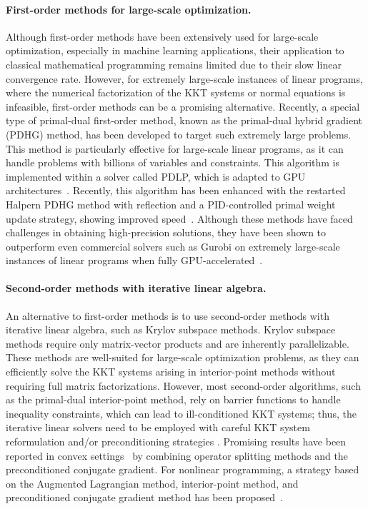 \documentclass[smallextended]{svjour3}
\begin{document}
\paragraph{First-order methods for large-scale optimization.}
Although first-order methods have been extensively used for large-scale optimization, especially in machine learning applications, their application to classical mathematical programming remains limited due to their slow linear convergence rate.
However, for extremely large-scale instances of linear programs, where the numerical factorization of the KKT systems or normal equations is infeasible, first-order methods can be a promising alternative.
Recently, a special type of primal-dual first-order method, known as the primal-dual hybrid gradient (PDHG) method, has been developed to target such extremely large problems.
This method is particularly effective for large-scale linear programs, as it can handle problems with billions of variables and constraints.
This algorithm is implemented within a solver called PDLP, which is adapted to GPU architectures~\cite{lu2023cupdlp,lu2023cupdlp2}.
Recently, this algorithm has been enhanced with the restarted Halpern PDHG method with reflection and a PID-controlled primal weight update strategy, showing improved speed~\cite{luCuPDLPFurtherEnhanced2025}.
Although these methods have faced challenges in obtaining high-precision solutions, they have been shown to outperform even commercial solvers such as Gurobi on extremely large-scale instances of linear programs when fully GPU-accelerated~\cite{lu2023cupdlp,lu2023cupdlp2}.

\paragraph{Second-order methods with iterative linear algebra.}
An alternative to first-order methods is to use second-order methods with iterative linear algebra, such as Krylov subspace methods.
Krylov subspace methods require only matrix-vector products and are inherently parallelizable.
These methods are well-suited for large-scale optimization problems, as they can efficiently solve the KKT systems arising in interior-point methods without requiring full matrix factorizations.
However, most second-order algorithms, such as the primal-dual interior-point method, rely on barrier functions to handle inequality constraints, which can lead to ill-conditioned KKT systems; thus, the iterative linear solvers need to be employed with careful KKT system reformulation and/or preconditioning strategies \cite{curtisNoteImplementationInteriorpoint2012,rodriguezScalablePreconditioningBlockstructured2020}.
Promising results have been reported in convex settings~\cite{schubigerGPUAccelerationADMM2020} by combining operator splitting methods and the preconditioned conjugate gradient.
For nonlinear programming, a strategy based on the Augmented Lagrangian method, interior-point method, and preconditioned conjugate gradient method has been proposed~\cite{cao2016augmented}.
\end{document}
